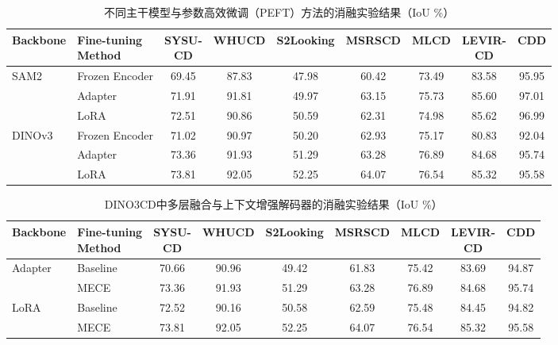 \begin{table}[!htb]
\centering
\small
\setlength{\tabcolsep}{3pt} %
\caption{不同主干模型与参数高效微调（PEFT）方法的消融实验结果（IoU \%）}
\label{tab:peftcd_ablation}
\begin{tabularx}{\textwidth}{p{1.8cm} p{2.5cm} *{7}{c}}
\toprule
\textbf{Backbone} & \makecell{\textbf{Fine-tuning}\\\textbf{Method}} & \makecell{\textbf{SYSU-}\\\textbf{CD}} & \textbf{WHUCD} & \textbf{S2Looking} & \textbf{MSRSCD} & \textbf{MLCD} & \makecell{\textbf{LEVIR-}\\\textbf{CD}} & \textbf{CDD} \\
\midrule
\multirow{3}{*}{SAM2}
& Frozen Encoder & 69.45 & 87.83 & 47.98 & 60.42 & 73.49 & 83.58 & 95.95 \\
& Adapter        & 71.91 & 91.81 & 49.97 & 63.15 & 75.73 & 85.60 & 97.01 \\
& LoRA           & 72.51 & 90.86 & 50.59 & 62.31 & 74.98 & 85.62 & 96.99 \\
\midrule
\multirow{3}{*}{DINOv3}
& Frozen Encoder & 71.02 & 90.97 & 50.20 & 62.93 & 75.17 & 80.83 & 92.04 \\
& Adapter        & 73.36 & 91.93 & 51.29 & 63.28 & 76.89 & 84.68 & 95.74 \\
& LoRA           & 73.81 & 92.05 & 52.25 & 64.07 & 76.54 & 85.32 & 95.58 \\
\bottomrule
\end{tabularx}
\end{table}

\begin{table}[!htb]
\centering
\small
\setlength{\tabcolsep}{3pt} %
\caption{DINO3CD中多层融合与上下文增强解码器的消融实验结果（IoU \%）}
\label{tab:peftcd_dino3cd_ablation}
\begin{tabularx}{\textwidth}{p{1.8cm} p{2.5cm} *{7}{c}}
\toprule
\textbf{Backbone} & \makecell{\textbf{Fine-tuning}\\\textbf{Method}} & \makecell{\textbf{SYSU-}\\\textbf{CD}} & \textbf{WHUCD} & \textbf{S2Looking} & \textbf{MSRSCD} & \textbf{MLCD} & \makecell{\textbf{LEVIR-}\\\textbf{CD}} & \textbf{CDD} \\
\midrule
\multirow{2}{*}{Adapter} 
& Baseline & 70.66 & 90.96 & 49.42 & 61.83 & 75.42 & 83.69 & 94.87 \\
& MECE     & 73.36 & 91.93 & 51.29 & 63.28 & 76.89 & 84.68 & 95.74 \\
\midrule
\multirow{2}{*}{LoRA}    
& Baseline & 72.52 & 90.16 & 50.58 & 62.59 & 75.48 & 84.45 & 94.82 \\
& MECE     & 73.81 & 92.05 & 52.25 & 64.07 & 76.54 & 85.32 & 95.58 \\
\bottomrule
\end{tabularx}
\end{table}



